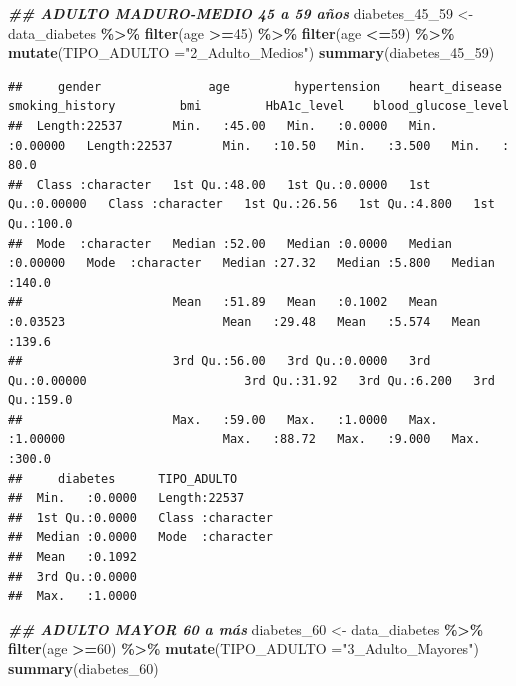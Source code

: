 \documentclass[
]{article}
\newenvironment{Shaded}{\begin{snugshade}}{\end{snugshade}}
\newcommand{\AttributeTok}[1]{\textcolor[rgb]{0.13,0.29,0.53}{#1}}
\newcommand{\DecValTok}[1]{\textcolor[rgb]{0.00,0.00,0.81}{#1}}
\newcommand{\DocumentationTok}[1]{\textcolor[rgb]{0.56,0.35,0.01}{\textbf{\textit{#1}}}}
\newcommand{\FunctionTok}[1]{\textcolor[rgb]{0.13,0.29,0.53}{\textbf{#1}}}
\newcommand{\NormalTok}[1]{#1}
\newcommand{\OtherTok}[1]{\textcolor[rgb]{0.56,0.35,0.01}{#1}}
\newcommand{\SpecialCharTok}[1]{\textcolor[rgb]{0.81,0.36,0.00}{\textbf{#1}}}
\newcommand{\StringTok}[1]{\textcolor[rgb]{0.31,0.60,0.02}{#1}}
\begin{document}
\begin{Shaded}
\begin{Highlighting}[]
\DocumentationTok{\#\# ADULTO MADURO{-}MEDIO 45 a 59 años}
\NormalTok{diabetes\_45\_59 }\OtherTok{\textless{}{-}}\NormalTok{ data\_diabetes }\SpecialCharTok{\%\textgreater{}\%} \FunctionTok{filter}\NormalTok{(age }\SpecialCharTok{\textgreater{}=}\DecValTok{45}\NormalTok{) }\SpecialCharTok{\%\textgreater{}\%} \FunctionTok{filter}\NormalTok{(age }\SpecialCharTok{\textless{}=}\DecValTok{59}\NormalTok{) }\SpecialCharTok{\%\textgreater{}\%} \FunctionTok{mutate}\NormalTok{(}\AttributeTok{TIPO\_ADULTO =}\StringTok{"2\_Adulto\_Medios"}\NormalTok{)}
\FunctionTok{summary}\NormalTok{(diabetes\_45\_59)}
\end{Highlighting}
\end{Shaded}

\begin{verbatim}
##     gender               age         hypertension    heart_disease     smoking_history         bmi         HbA1c_level    blood_glucose_level
##  Length:22537       Min.   :45.00   Min.   :0.0000   Min.   :0.00000   Length:22537       Min.   :10.50   Min.   :3.500   Min.   : 80.0      
##  Class :character   1st Qu.:48.00   1st Qu.:0.0000   1st Qu.:0.00000   Class :character   1st Qu.:26.56   1st Qu.:4.800   1st Qu.:100.0      
##  Mode  :character   Median :52.00   Median :0.0000   Median :0.00000   Mode  :character   Median :27.32   Median :5.800   Median :140.0      
##                     Mean   :51.89   Mean   :0.1002   Mean   :0.03523                      Mean   :29.48   Mean   :5.574   Mean   :139.6      
##                     3rd Qu.:56.00   3rd Qu.:0.0000   3rd Qu.:0.00000                      3rd Qu.:31.92   3rd Qu.:6.200   3rd Qu.:159.0      
##                     Max.   :59.00   Max.   :1.0000   Max.   :1.00000                      Max.   :88.72   Max.   :9.000   Max.   :300.0      
##     diabetes      TIPO_ADULTO       
##  Min.   :0.0000   Length:22537      
##  1st Qu.:0.0000   Class :character  
##  Median :0.0000   Mode  :character  
##  Mean   :0.1092                     
##  3rd Qu.:0.0000                     
##  Max.   :1.0000
\end{verbatim}

\begin{Shaded}
\begin{Highlighting}[]
\DocumentationTok{\#\# ADULTO MAYOR 60 a más}
\NormalTok{diabetes\_60 }\OtherTok{\textless{}{-}}\NormalTok{ data\_diabetes }\SpecialCharTok{\%\textgreater{}\%} \FunctionTok{filter}\NormalTok{(age }\SpecialCharTok{\textgreater{}=}\DecValTok{60}\NormalTok{) }\SpecialCharTok{\%\textgreater{}\%} \FunctionTok{mutate}\NormalTok{(}\AttributeTok{TIPO\_ADULTO =}\StringTok{"3\_Adulto\_Mayores"}\NormalTok{)}
\FunctionTok{summary}\NormalTok{(diabetes\_60)}
\end{Highlighting}
\end{Shaded}
\end{document}
